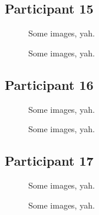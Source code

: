 
\clearpage

\subsection{Participant 15}

\begin{figure}[h]
	\caption{Some images, yah.}
\end{figure}

\clearpage

\begin{figure}[h]
	\caption{Some images, yah.}
\end{figure}


\clearpage

\subsection{Participant 16}

\begin{figure}[h]
	\caption{Some images, yah.}
\end{figure}

\clearpage

\begin{figure}[h]
	\caption{Some images, yah.}
\end{figure}


\clearpage

\subsection{Participant 17}

\begin{figure}[h]
	\caption{Some images, yah.}
\end{figure}

\clearpage

\begin{figure}[h]
	\caption{Some images, yah.}
\end{figure}

